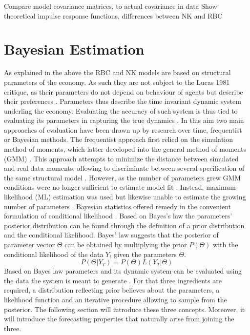 \documentclass[12pt,a4paper,english]{article} %
\let\oldsection\section
\renewcommand\section{\clearpage\oldsection}
\begin{document}
	Compare model covariance matrices, to actual covariance in data
	Show theoretical impulse response functions, differences between NK and RBC
			
	\section{Bayesian Estimation}
	As explained in the above the RBC and NK models are based on structural parameters of the economy. As such they are not subject to the Lucas 1981 critique, as their parameters do not depend on behaviour of agents but describe their preferences \cite{lucas_jr_tobin_1981}. Parameters thus describe the time invariant dynamic system underling the economy. Evaluating the accuracy of such system is thus tied to evaluating its parameters in capturing the true dynamics \cite{herbst_bayesian_2016}. In this aim two main approaches of evaluation have been drawn up by research over time, frequentist or Bayesian methods. 
	The frequentist approach first relied on the simulation method of moments, which latter developed into the general method of moments (GMM) \cite{blanchard_solution_1980}. This approach attempts to minimize the distance between simulated and real data moments, allowing to discriminate between several specification of the same structural model \cite{christiano_current_1992}. However, as the number of parameters grew GMM conditions were no longer sufficient to estimate model fit \cite{guerron-quintana_bayesian_2013}. Instead, maximum-likelihood (ML) estimation was used but likewise unable to estimate the growing number of parameters \cite{guerron-quintana_bayesian_2013}. Bayesian statistics offered remedy in the convenient formulation of conditional likelihood \cite{guerron-quintana_bayesian_2013}. Based on Bayes's law the parameters' posterior distribution can be found through the definition of a prior distribution and the conditional likelihood. 
	Bayes' law suggests that the posterior of parameter vector $\Theta$ can be obtained by multiplying the prior $P(\Theta)$ with the conditional likelihood of the data $Y_t$ given the parameters $\Theta$. 
	\begin{equation} \label{eq:blaw}
		P( \Theta | Y_{T}) = P(\Theta) L(Y_{T} | \Theta)
	\end{equation}
	Based on Bayes law parameters and its dynamic system can be evaluated using the data the system is meant to generate \cite{herbst_bayesian_2016}. For that three ingredients are required, a distribution reflecting prior believes about the parameters, a likelihood function and an iterative procedure allowing to sample from the posterior. The following section will introduce these three concepts. Moreover, it will introduce the forecasting properties that naturally arise from joining the three. 
\end{document}
